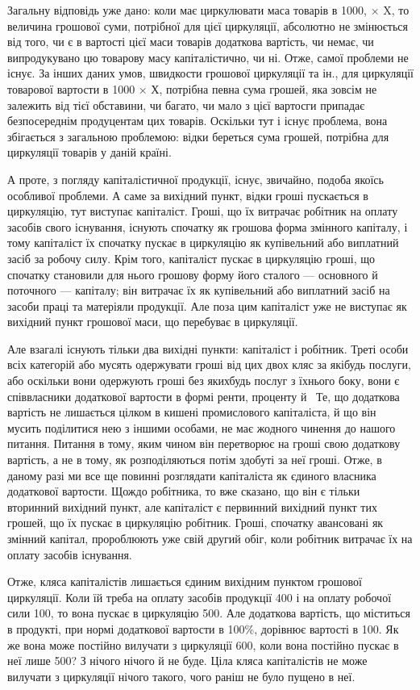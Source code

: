 
Загальну відповідь уже дано: коли має циркулювати маса товарів в
1000, × X, то величина грошової суми, потрібної для цієї циркуляції,
абсолютно не змінюється від того, чи є в вартості цієї маси товарів
додаткова вартість, чи немає, чи випродукувано цю товарову масу
капіталістично, чи ні. Отже, самої проблеми не існує. За інших
даних умов, швидкости грошової циркуляції та ін., для циркуляції товарової
вартости в 1000 × Х, потрібна певна сума грошей, яка
зовсім не залежить від тієї обставини, чи багато, чи мало з цієї вартосги
припадає безпосереднім продуцентам цих товарів. Оскільки тут і існує
проблема, вона збігається з загальною проблемою: відки береться сума
грошей, потрібна для циркуляції товарів у даній країні.

А проте, з погляду капіталістичної продукції, існує, звичайно, подоба
якоїсь особливої проблеми. А саме за вихідний пункт, відки гроші пускається
в циркуляцію, тут виступає капіталіст. Гроші, що їх витрачає
робітник на оплату засобів свого існування, існують спочатку як грошова
форма змінного капіталу, і тому капіталіст їх спочатку пускає в
циркуляцію як купівельний або виплатний засіб за робочу силу. Крім
того, капіталіст пускає в циркуляцію гроші, що спочатку становили для
нього грошову форму його сталого — основного й поточного — капіталу;
він витрачає їх як купівельний або виплатний засіб на засоби праці та
матеріяли продукції. Але поза цим капіталіст уже не виступає як вихідний
пункт грошової маси, що перебуває в циркуляції.

Але взагалі існують тільки два вихідні пункти: капіталіст і робітник.
Треті особи всіх категорій або мусять одержувати гроші від цих двох
кляс за якібудь послуги, або оскільки вони одержують гроші без якихбудь
послуг з їхнього боку, вони є співвласники додаткової вартости в
формі ренти, проценту й~ Те, що додаткова вартість не лишається
цілком в кишені промислового капіталіста, й що він мусить поділитися
нею з іншими особами, не має жодного чинення до нашого питання.
Питання в тому, яким чином він перетворює на гроші свою додаткову
вартість, а не в тому, як розподіляються потім здобуті за неї гроші.
Отже, в даному разі ми все ще повинні розглядати капіталіста як єдиного
власника додаткової вартости. Щождо робітника, то вже сказано, що
він є тільки вторинний вихідний пункт, але капіталіст є первинний
вихідний пункт тих грошей, що їх пускає в циркуляцію робітник. Гроші,
спочатку авансовані як змінний капітал, пророблюють уже свій другий
обіг, коли робітник витрачає їх на оплату засобів існування.

Отже, кляса капіталістів лишається єдиним вихідним пунктом грошової
циркуляції. Коли їй треба на оплату засобів продукції 400
і на оплату робочої сили 100, то вона пускає в циркуляцію
500. Але додаткова вартість, що міститься в продукті, при нормі
додаткової вартости в 100\%, дорівнює вартості в 100. Як
же вона може постійно вилучати з циркуляції 600, коли
вона постійно пускає в неї лише 500? З нічого нічого й не
буде. Ціла кляса капіталістів не може вилучати з циркуляції нічого такого,
чого раніш не було пущено в неї.
